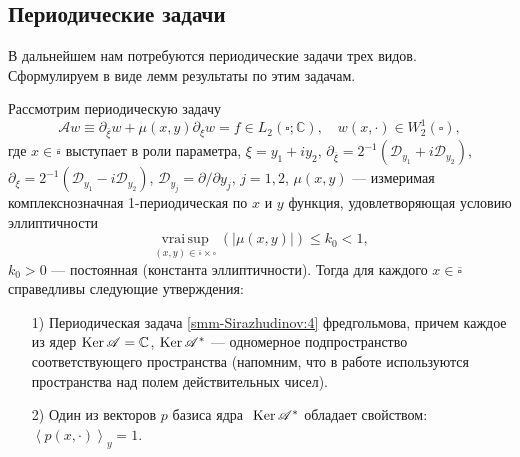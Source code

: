 	\subsection{Периодические задачи}
	В дальнейшем нам потребуются периодические задачи трех видов. Сформулируем в виде   лемм  результаты по этим задачам.
	\begin{lemma}
		Рассмотрим периодическую задачу
		\begin{equation}\label{smm-Sirazhudinov:4}
			\mathscr{A}w\equiv\partial_{\bar{\xi}}w+\mu(x,y)\partial_\xi w=f\in L_2 (\square;\mathbb{C}),\quad w(x,\cdot)
			\in W_2^1 (\square),
		\end{equation}
		где $x\in \overline{\square}$ выступает в роли параметра, $\xi=y_1+iy_2$,
		$\partial_{\bar{\xi}}=2^{-1}(\mathscr{D}_{y_1}+i\mathscr{D}_{y_2})$,
		$\partial_\xi=2^{-1}(\mathscr{D}_{y_1}-i\mathscr{D}_{y_2})$,
		$\mathscr{D}_{y_j}=\partial/\partial y_j$, $j=1,2$,
		$\mu(x,y)$ --- измеримая комплекснозначная 1-периодическая по $x$ и $y$ функция, удовлетворяющая условию эллиптичности
		\begin{equation}\label{smm-Sirazhudinov:5}
			\mathop{\mathrm{vrai\, sup}}\limits_{(x,y)\in\overline\square\times\square} (|\mu(x,y)|)     \leqslant k_0<1,
		\end{equation}
		$k_0>0$ --- постоянная {\rm(}константа эллиптичности{\rm)}.
		Тогда для  каждого $x\in \overline\square$ справедливы следующие утверждения:
		\begin{enumerate}
			\item[1)]       Периодическая задача \eqref{smm-Sirazhudinov:4} фредгольмова, причем каждое из ядер $\text{Ker\,}\mathscr{A}=\mathbb{C}$, $\text{Ker\,}\mathscr{A}^\ast$ --- одномерное подпространство соответствующего пространства {\rm(}напомним,
			что в работе используются пространства над полем действительных чисел{\rm)}.
			\item[2)] Один из векторов $p$ базиса ядра $\text{ Ker\,}\mathscr{A}^\ast$ обладает свойством: $\left\langle p(x,\cdot)\right\rangle_y=1$.
		\end{enumerate}
	\end{lemma}
